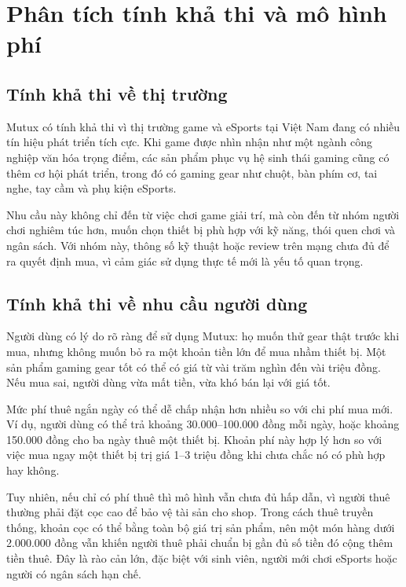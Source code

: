 \section{Phân tích tính khả thi và mô hình phí}

\subsection{Tính khả thi về thị trường}

Mutux có tính khả thi vì thị trường game và eSports tại Việt Nam đang có nhiều tín hiệu phát triển tích cực. Khi game được nhìn nhận như một ngành công nghiệp văn hóa trọng điểm, các sản phẩm phục vụ hệ sinh thái gaming cũng có thêm cơ hội phát triển, trong đó có gaming gear như chuột, bàn phím cơ, tai nghe, tay cầm và phụ kiện eSports.

Nhu cầu này không chỉ đến từ việc chơi game giải trí, mà còn đến từ nhóm người chơi nghiêm túc hơn, muốn chọn thiết bị phù hợp với kỹ năng, thói quen chơi và ngân sách. Với nhóm này, thông số kỹ thuật hoặc review trên mạng chưa đủ để ra quyết định mua, vì cảm giác sử dụng thực tế mới là yếu tố quan trọng.

\subsection{Tính khả thi về nhu cầu người dùng}

Người dùng có lý do rõ ràng để sử dụng Mutux: họ muốn thử gear thật trước khi mua, nhưng không muốn bỏ ra một khoản tiền lớn để mua nhầm thiết bị. Một sản phẩm gaming gear tốt có thể có giá từ vài trăm nghìn đến vài triệu đồng. Nếu mua sai, người dùng vừa mất tiền, vừa khó bán lại với giá tốt.

Mức phí thuê ngắn ngày có thể dễ chấp nhận hơn nhiều so với chi phí mua mới. Ví dụ, người dùng có thể trả khoảng 30.000--100.000 đồng mỗi ngày, hoặc khoảng 150.000 đồng cho ba ngày thuê một thiết bị. Khoản phí này hợp lý hơn so với việc mua ngay một thiết bị trị giá 1--3 triệu đồng khi chưa chắc nó có phù hợp hay không.

Tuy nhiên, nếu chỉ có phí thuê thì mô hình vẫn chưa đủ hấp dẫn, vì người thuê thường phải đặt cọc cao để bảo vệ tài sản cho shop. Trong cách thuê truyền thống, khoản cọc có thể bằng toàn bộ giá trị sản phẩm, nên một món hàng dưới 2.000.000 đồng vẫn khiến người thuê phải chuẩn bị gần đủ số tiền đó cộng thêm tiền thuê. Đây là rào cản lớn, đặc biệt với sinh viên, người mới chơi eSports hoặc người có ngân sách hạn chế.

